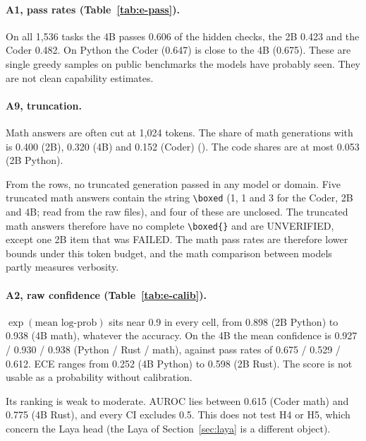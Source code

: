 \documentclass[11pt,a4paper]{article}
\newcommand{\code}[1]{\texttt{\detokenize{#1}}}
\begin{document}
{\def\small{\fontsize{7}{8.5}\selectfont}\setlength{\tabcolsep}{1.8pt}}

\paragraph{A1, pass rates (Table~\ref{tab:e-pass}).} On all 1,536 tasks the 4B passes 0.606 of the
hidden checks, the 2B 0.423 and the Coder 0.482. On Python the Coder (0.647) is close to the 4B
(0.675). These are single greedy samples on public benchmarks the models have probably seen. They
are not clean capability estimates.

\paragraph{A9, truncation.} Math answers are often cut at 1,024 tokens. The share of math
generations with \code{finish_reason = length} is 0.400 (2B), 0.320 (4B) and 0.152 (Coder)
(\code{A9.trunc.*.math}). The code shares are at most 0.053 (2B Python).

From the rows, no truncated generation passed in any model or domain. Five truncated math answers
contain the string \verb|\boxed| (1, 1 and 3 for the Coder, 2B and 4B; read from the raw files),
and four of these are unclosed. The truncated math answers therefore have no complete
\verb|\boxed{}| and are UNVERIFIED, except one 2B item that was FAILED. The math pass
rates are therefore lower bounds under this token budget, and the math comparison between models
partly measures verbosity.

\paragraph{A2, raw confidence (Table~\ref{tab:e-calib}).} $\exp(\text{mean log-prob})$ sits near
0.9 in every cell, from 0.898 (2B Python) to 0.938 (4B math), whatever the accuracy. On the 4B the
mean confidence is 0.927 / 0.930 / 0.938 (Python / Rust / math), against pass rates of 0.675 /
0.529 / 0.612. ECE ranges from 0.252 (4B Python) to 0.598 (2B Rust). The score is not usable as a
probability without calibration.

Its ranking is weak to moderate. AUROC lies between 0.615 (Coder math) and 0.775 (4B Rust), and
every CI excludes 0.5. This does not test H4 or H5, which concern the Laya head (the Laya of Section~\ref{sec:laya} is a different object).
\end{document}
